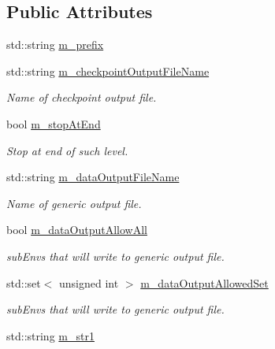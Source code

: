 \subsection*{Public Attributes}
\begin{DoxyCompactItemize}
\item 
std\-::string \hyperlink{class_q_u_e_s_o_1_1_m_l_sampling_level_options_a4423067de3fa689d820abeba4dc5babc}{m\-\_\-prefix}
\item 
std\-::string \hyperlink{class_q_u_e_s_o_1_1_m_l_sampling_level_options_aa53156a239401da4600af25921bac260}{m\-\_\-checkpoint\-Output\-File\-Name}
\begin{DoxyCompactList}\small\item\em Name of checkpoint output file. \end{DoxyCompactList}\item 
bool \hyperlink{class_q_u_e_s_o_1_1_m_l_sampling_level_options_adbdb0fa054244261b7beb2cead72ef06}{m\-\_\-stop\-At\-End}
\begin{DoxyCompactList}\small\item\em Stop at end of such level. \end{DoxyCompactList}\item 
std\-::string \hyperlink{class_q_u_e_s_o_1_1_m_l_sampling_level_options_a56871c5760820c93526948a6e1c024e5}{m\-\_\-data\-Output\-File\-Name}
\begin{DoxyCompactList}\small\item\em Name of generic output file. \end{DoxyCompactList}\item 
bool \hyperlink{class_q_u_e_s_o_1_1_m_l_sampling_level_options_ad6a290719785a151c5876bb04145442a}{m\-\_\-data\-Output\-Allow\-All}
\begin{DoxyCompactList}\small\item\em sub\-Envs that will write to generic output file. \end{DoxyCompactList}\item 
std\-::set$<$ unsigned int $>$ \hyperlink{class_q_u_e_s_o_1_1_m_l_sampling_level_options_aeead47ca5a3ccd405bae013a344d1dce}{m\-\_\-data\-Output\-Allowed\-Set}
\begin{DoxyCompactList}\small\item\em sub\-Envs that will write to generic output file. \end{DoxyCompactList}\item 
std\-::string \hyperlink{class_q_u_e_s_o_1_1_m_l_sampling_level_options_ac3586b30eb3e0f67e44074073bb157ff}{m\-\_\-str1}

\end{DoxyCompactItemize}
